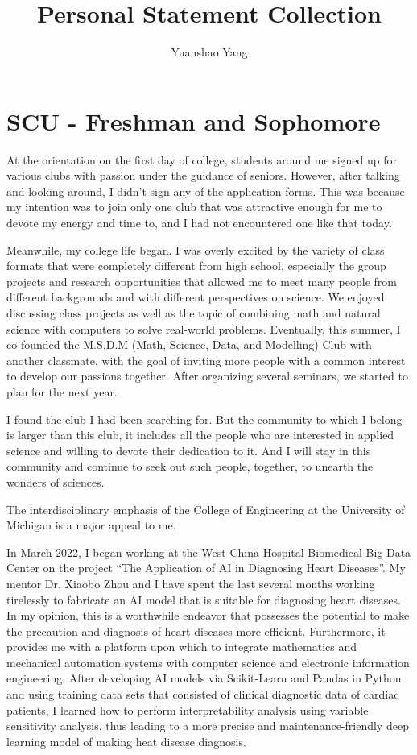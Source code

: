 \documentclass[12pt]{article}
\title{Personal Statement Collection}
\author{Yuanshao Yang}
\date{}
\begin{document}
\maketitle

\section{SCU - Freshman and Sophomore}

At the orientation on the first day of college, students around me signed up for various clubs with passion under the guidance of seniors. However, after talking and looking around, I didn’t sign any of the application forms. This was because my intention was to join only one club that was attractive enough for me to devote my energy and time to, and I had not encountered one like that today. 

Meanwhile, my college life began. I was overly excited by the variety of class formats that were completely different from high school, especially the group projects and research opportunities that allowed me to meet many people from different backgrounds and with different perspectives on science. We enjoyed discussing class projects as well as the topic of combining math and natural science with computers to solve real-world problems. Eventually, this summer, I co-founded the M.S.D.M (Math, Science, Data, and Modelling) Club with another classmate, with the goal of inviting more people with a common interest to develop our passions together. After organizing several seminars, we started to plan for the next year. 

I found the club I had been searching for. But the community to which I belong is larger than this club, it includes all the people who are interested in applied science and willing to devote their dedication to it. And I will stay in this community and continue to seek out such people, together, to unearth the wonders of sciences.

The interdisciplinary emphasis of the College of Engineering at the University of Michigan is a major appeal to me.

In March 2022, I began working at the West China Hospital Biomedical Big Data Center on the project “The Application of AI in Diagnosing Heart Diseases”. My mentor Dr. Xiaobo Zhou and I have spent the last several months working tirelessly to fabricate an AI model that is suitable for diagnosing heart diseases. In my opinion, this is a worthwhile endeavor that possesses the potential to make the precaution and diagnosis of heart diseases more efficient. Furthermore, it provides me with a platform upon which to integrate mathematics and mechanical automation systems with computer science and electronic information engineering. After developing AI models via Scikit-Learn and Pandas in Python and using training data sets that consisted of clinical diagnostic data of cardiac patients, I learned how to perform interpretability analysis using variable sensitivity analysis, thus leading to a more precise and maintenance-friendly deep learning model of making heat disease diagnosis.
\end{document}
